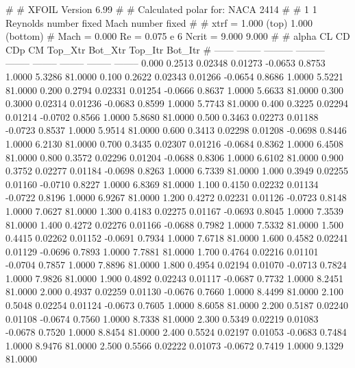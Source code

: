 #  
#       XFOIL         Version 6.99
#  
# Calculated polar for: NACA 2414                                       
#  
# 1 1 Reynolds number fixed          Mach number fixed         
#  
# xtrf =   1.000 (top)        1.000 (bottom)  
# Mach =   0.000     Re =     0.075 e 6     Ncrit =   9.000  9.000
#  
#   alpha    CL        CD       CDp       CM     Top_Xtr  Bot_Xtr  Top_Itr  Bot_Itr
#  ------ -------- --------- --------- -------- -------- -------- -------- --------
   0.000   0.2513   0.02348   0.01273  -0.0653   0.8753   1.0000   5.3286  81.0000
   0.100   0.2622   0.02343   0.01266  -0.0654   0.8686   1.0000   5.5221  81.0000
   0.200   0.2794   0.02331   0.01254  -0.0666   0.8637   1.0000   5.6633  81.0000
   0.300   0.3000   0.02314   0.01236  -0.0683   0.8599   1.0000   5.7743  81.0000
   0.400   0.3225   0.02294   0.01214  -0.0702   0.8566   1.0000   5.8680  81.0000
   0.500   0.3463   0.02273   0.01188  -0.0723   0.8537   1.0000   5.9514  81.0000
   0.600   0.3413   0.02298   0.01208  -0.0698   0.8446   1.0000   6.2130  81.0000
   0.700   0.3435   0.02307   0.01216  -0.0684   0.8362   1.0000   6.4508  81.0000
   0.800   0.3572   0.02296   0.01204  -0.0688   0.8306   1.0000   6.6102  81.0000
   0.900   0.3752   0.02277   0.01184  -0.0698   0.8263   1.0000   6.7339  81.0000
   1.000   0.3949   0.02255   0.01160  -0.0710   0.8227   1.0000   6.8369  81.0000
   1.100   0.4150   0.02232   0.01134  -0.0722   0.8196   1.0000   6.9267  81.0000
   1.200   0.4272   0.02231   0.01126  -0.0723   0.8148   1.0000   7.0627  81.0000
   1.300   0.4183   0.02275   0.01167  -0.0693   0.8045   1.0000   7.3539  81.0000
   1.400   0.4272   0.02276   0.01166  -0.0688   0.7982   1.0000   7.5332  81.0000
   1.500   0.4415   0.02262   0.01152  -0.0691   0.7934   1.0000   7.6718  81.0000
   1.600   0.4582   0.02241   0.01129  -0.0696   0.7893   1.0000   7.7881  81.0000
   1.700   0.4764   0.02216   0.01101  -0.0704   0.7857   1.0000   7.8896  81.0000
   1.800   0.4954   0.02194   0.01070  -0.0713   0.7824   1.0000   7.9826  81.0000
   1.900   0.4892   0.02243   0.01117  -0.0687   0.7732   1.0000   8.2451  81.0000
   2.000   0.4937   0.02259   0.01130  -0.0676   0.7660   1.0000   8.4499  81.0000
   2.100   0.5048   0.02254   0.01124  -0.0673   0.7605   1.0000   8.6058  81.0000
   2.200   0.5187   0.02240   0.01108  -0.0674   0.7560   1.0000   8.7338  81.0000
   2.300   0.5349   0.02219   0.01083  -0.0678   0.7520   1.0000   8.8454  81.0000
   2.400   0.5524   0.02197   0.01053  -0.0683   0.7484   1.0000   8.9476  81.0000
   2.500   0.5566   0.02222   0.01073  -0.0672   0.7419   1.0000   9.1329  81.0000
